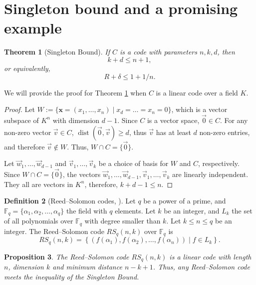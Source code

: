 \documentclass[11pt, oneside]{amsart}
\newtheorem{thm}{Theorem}[section]
\newtheorem{prop}[thm]{Proposition}
\theoremstyle{definition}
\newtheorem{defn}[thm]{Definition}
\theoremstyle{remark}
\numberwithin{equation}{section}
\DeclareMathOperator{\dist}{dist}
\begin{document}
\section{Singleton bound and a promising example} \label{s:singleton}
\begin{thm}[Singleton Bound]\label{thm:singleton_bound}
If $C$ is a code with parameters $n, k, d$, then 
	\begin{equation} %
		k + d \le n + 1,
	\end{equation} 
	or equivalently, 
	\begin{equation}
		R + \delta \le 1 + 1/n.
	\end{equation}
\end{thm}
	
We will provide the proof for Theorem \ref{thm:singleton_bound} when $C$ is a linear code over a field $K$.

\begin{proof}
	Let $W := \{\mathbf{x} = (x_1, \dots, x_n) \mid x_{d} = \dots = x_n = 0\}$, which is a vector subspace of $K^n$ with dimension $d - 1$. Since $C$ is a vector space, $\vec 0 \in C$. For any non-zero vector $\vec v \in C$, $\dist(\vec 0, \vec v) \ge d$, thus $\vec v$ has at least $d$ non-zero entries, and therefore $\vec v \notin W$. Thus, $W \cap C = \{\vec 0\}$.

	Let $\vec w_1, \dots, \vec w_{d-1}$ and $\vec v_1, \dots, \vec v_k$ be a choice of basis for $W$ and $C$, respectively. Since $W \cap C = \{\vec 0\}$, the vectors $\vec w_1, \dots, \vec w_{d-1}, \vec v_1, \dots, \vec v_k$ are linearly independent. They all are vectors in $K^n$, therefore, $k + d - 1 \le n$.
\end{proof}

\begin{defn}[Reed--Solomon codes, \cite{LS87}]\label{defn:rs_codes}
	Let $q$ be a power of a prime, and $\mathbb{F}_q = \{\alpha_1, \alpha_2, \dots, \alpha_q\}$ the field with $q$ elements.
	Let $k$ be an integer, and ${L}_k$ the set of all polynomials over $\mathbb{F}_q$ with degree smaller than $k$.
	Let $k \le n \le q$ be an integer. The Reed--Solomon code $RS_q(n, k)$ over $\mathbb{F}_q$ is 
	\begin{equation}
		RS_q(n, k) = \left\{\left(f(\alpha_1), f(\alpha_2), \dots, f(\alpha_n)\right) \mid f \in {L}_k\right\}.
	\end{equation}
\end{defn}

\begin{prop}
	The Reed--Solomon code $RS_q(n, k)$ is a linear code with length $n$, dimension $k$ and minimum distance $n - k + 1$.
	Thus, any Reed--Solomon code meets the inequality of the Singleton Bound.
\end{prop}
\end{document}
